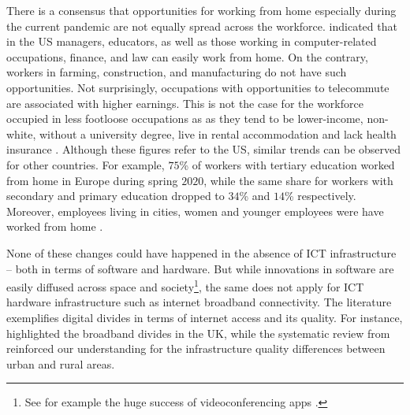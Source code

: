 \documentclass[]{interact}
\theoremstyle{plain}%
\theoremstyle{definition}
\theoremstyle{remark}
\begin{document}
There is a consensus that opportunities for working from home especially
during the current pandemic are not equally spread across the workforce.
\citet{NBERw26948} indicated that in the US managers, educators, as well
as those working in computer-related occupations, finance, and law can
easily work from home. On the contrary, workers in farming,
construction, and manufacturing do not have such opportunities. Not
surprisingly, occupations with opportunities to telecommute are
associated with higher earnings. This is not the case for the workforce
occupied in less footloose occupations as as they tend to be
lower-income, non-white, without a university degree, live in rental
accommodation and lack health insurance \citep{NBERw27085}. Although
these figures refer to the US, similar trends can be observed for other
countries. For example, \(75\)\% of workers with tertiary education
worked from home in Europe during spring \(2020\), while the same share
for workers with secondary and primary education dropped to \(34\)\% and
\(14\)\% respectively. Moreover, employees living in cities, women and
younger employees were have worked from home \citep{eurofound2020}.

None of these changes could have happened in the absence of ICT
infrastructure -- both in terms of software and hardware. But while
innovations in software are easily diffused across space and
society\footnote{See for example the huge success of videoconferencing
  apps \citep{marks2020zoom}.}, the same does not apply for ICT hardware
infrastructure such as internet broadband connectivity. The literature
exemplifies digital divides in terms of internet access and its quality.
For instance, \citet{riddlesden2014broadband} highlighted the broadband
divides in the UK, while the systematic review from
\citet{SALEMINK2017360} reinforced our understanding for the
infrastructure quality differences between urban and rural areas.
\end{document}
